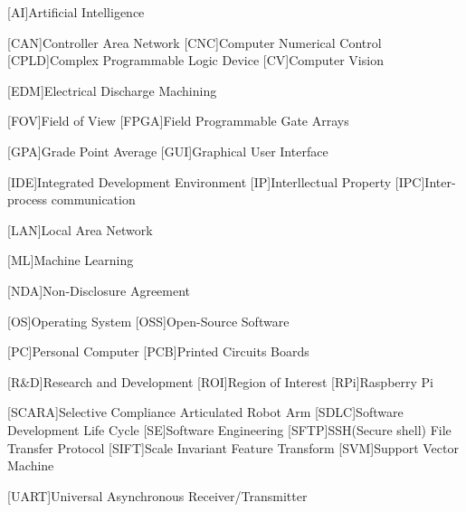 \begin{acronym}
	[AI]{Artificial Intelligence}
	
	[CAN]{Controller Area Network}
	[CNC]{Computer Numerical Control}
	[CPLD]{Complex Programmable Logic Device}
	[CV]{Computer Vision}
	
	[EDM]{Electrical Discharge Machining}
	
	[FOV]{Field of View}
	[FPGA]{Field Programmable Gate Arrays}
	
	[GPA]{Grade Point Average}
	[GUI]{Graphical User Interface}
	
	[IDE]{Integrated Development Environment}
	[IP]{Interllectual Property}
	[IPC]{Inter-process communication}
	
	[LAN]{Local Area Network}
	
	[ML]{Machine Learning}
	
	[NDA]{Non-Disclosure Agreement}
	
	[OS]{Operating System}
	[OSS]{Open-Source Software}
	
	[PC]{Personal Computer}
	[PCB]{Printed Circuits Boards}
	
	[R\&D]{Research and Development}
	[ROI]{Region of Interest}
	[RPi]{Raspberry Pi}
			
	[SCARA]{Selective Compliance Articulated Robot Arm}
	[SDLC]{Software Development Life Cycle}
	[SE]{Software Engineering}
	[SFTP]{SSH(Secure shell) File Transfer Protocol}
	[SIFT]{Scale Invariant Feature Transform}
	[SVM]{Support Vector Machine}
	
	[UART]{Universal Asynchronous Receiver/Transmitter}
\end{acronym}

